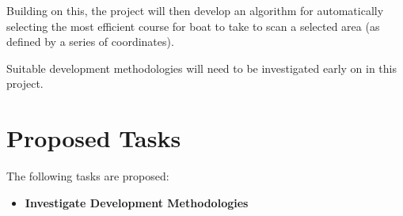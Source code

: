 \documentclass[titlepage 12pt]{article}
\begin{document}
{Building on this, the project will then develop an algorithm for automatically selecting the most efficient course for boat to take to scan a selected area (as defined by a series of coordinates). 

\cite{mmp}
          
Suitable development methodologies will need to be investigated early on in this project.

\section{Proposed Tasks}
The following tasks are proposed:
\begin{itemize}
\item \textbf{Investigate Development Methodologies}


\end{itemize}}
\end{document}
